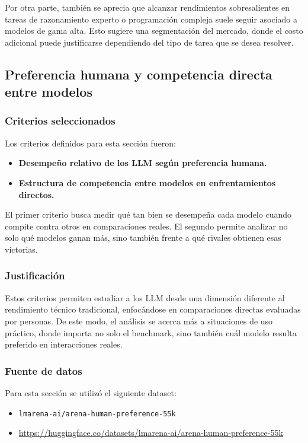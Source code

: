 \documentclass[12pt,a4paper]{article}
\begin{document}
Por otra parte, también se aprecia que alcanzar rendimientos sobresalientes en tareas de razonamiento experto o programación compleja suele seguir asociado a modelos de gama alta. Esto sugiere una segmentación del mercado, donde el costo adicional puede justificarse dependiendo del tipo de tarea que se desea resolver.

\subsection{Preferencia humana y competencia directa entre modelos}

\subsubsection*{Criterios seleccionados}
Los criterios definidos para esta sección fueron:

\begin{itemize}[leftmargin=1.2cm]
    \item \textbf{Desempeño relativo de los LLM según preferencia humana.}
    \item \textbf{Estructura de competencia entre modelos en enfrentamientos directos.}
\end{itemize}

El primer criterio busca medir qué tan bien se desempeña cada modelo cuando compite contra otros en comparaciones reales. El segundo permite analizar no solo qué modelos ganan más, sino también frente a qué rivales obtienen esas victorias.

\subsubsection*{Justificación}
Estos criterios permiten estudiar a los LLM desde una dimensión diferente al rendimiento técnico tradicional, enfocándose en comparaciones directas evaluadas por personas. De este modo, el análisis se acerca más a situaciones de uso práctico, donde importa no solo el benchmark, sino también cuál modelo resulta preferido en interacciones reales.

\subsubsection*{Fuente de datos}
Para esta sección se utilizó el siguiente dataset:

\begin{itemize}[leftmargin=1.2cm]
    \item \texttt{lmarena-ai/arena-human-preference-55k}
    \item \url{https://huggingface.co/datasets/lmarena-ai/arena-human-preference-55k}
\end{itemize}
\end{document}
